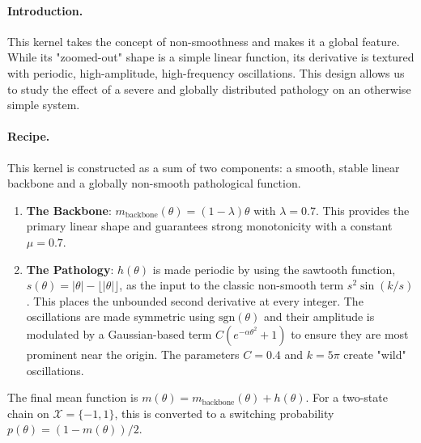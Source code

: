 \documentclass[a4paper]{article}
\begin{document}
\paragraph{Introduction.}
This kernel takes the concept of non-smoothness and makes it a global feature. While its "zoomed-out" shape is a simple linear function, its derivative is textured with periodic, high-amplitude, high-frequency oscillations. This design allows us to study the effect of a severe and globally distributed pathology on an otherwise simple system.

\paragraph{Recipe.}
This kernel is constructed as a sum of two components: a smooth, stable linear backbone and a globally non-smooth pathological function.
\begin{enumerate}
	\item \textbf{The Backbone}: $m_{\text{backbone}}(\theta) = (1-\lambda)\theta$ with $\lambda=0.7$. This provides the primary linear shape and guarantees strong monotonicity with a constant $\mu=0.7$.
	\item \textbf{The Pathology}: $h(\theta)$ is made periodic by using the sawtooth function, $s(\theta) = |\theta| - \lfloor|\theta|\rfloor$, as the input to the classic non-smooth term $s^2\sin(k/s)$. This places the unbounded second derivative at every integer. The oscillations are made symmetric using $\text{sgn}(\theta)$ and their amplitude is modulated by a Gaussian-based term $C(e^{-\alpha\theta^2}+1)$ to ensure they are most prominent near the origin. The parameters $C=0.4$ and $k=5\pi$ create "wild" oscillations.
\end{enumerate}
The final mean function is $m(\theta) = m_{\text{backbone}}(\theta) + h(\theta)$. For a two-state chain on $\mathcal{X}=\{-1, 1\}$, this is converted to a switching probability $p(\theta) = (1-m(\theta))/2$.
\end{document}
